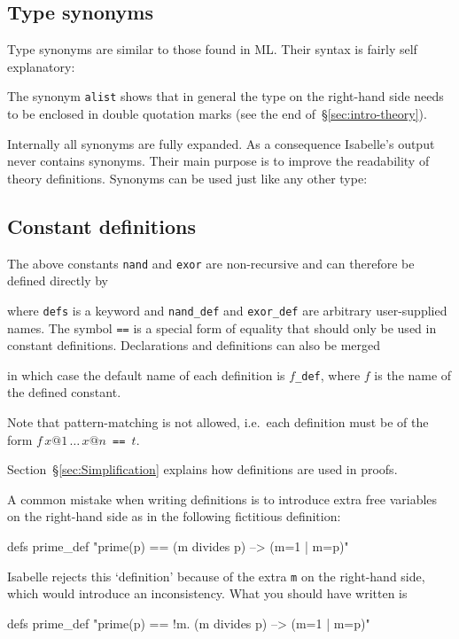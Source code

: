 \subsection{Type synonyms}

Type synonyms are similar to those found in ML. Their syntax is fairly self
explanatory:
\begin{ttbox}
\end{ttbox}
The synonym \texttt{alist} shows that in general the type on the right-hand
side needs to be enclosed in double quotation marks
(see the end of~\S\ref{sec:intro-theory}).

Internally all synonyms are fully expanded.  As a consequence Isabelle's
output never contains synonyms.  Their main purpose is to improve the
readability of theory definitions.  Synonyms can be used just like any other
type:
\begin{ttbox}
\end{ttbox}

\subsection{Constant definitions}
\label{sec:ConstDefinitions}

The above constants \texttt{nand} and \texttt{exor} are non-recursive and can
therefore be defined directly by
\begin{ttbox}
\end{ttbox}
where \texttt{defs} is a keyword and \texttt{nand_def} and \texttt{exor_def}
are arbitrary user-supplied names.
The symbol \texttt{==} is a special form of equality
that should only be used in constant definitions.
Declarations and definitions can also be merged
\begin{ttbox}
\end{ttbox}
in which case the default name of each definition is $f$\texttt{_def}, where
$f$ is the name of the defined constant.

Note that pattern-matching is not allowed, i.e.\ each definition must be of
the form $f\,x@1\,\dots\,x@n$\texttt{~==~}$t$.

Section~\S\ref{sec:Simplification} explains how definitions are used
in proofs.

\begin{warn}
A common mistake when writing definitions is to introduce extra free variables
on the right-hand side as in the following fictitious definition:
\begin{ttbox}
defs  prime_def "prime(p) == (m divides p) --> (m=1 | m=p)"
\end{ttbox}
Isabelle rejects this `definition' because of the extra {\tt m} on the
right-hand side, which would introduce an inconsistency.  What you should have
written is
\begin{ttbox}
defs  prime_def "prime(p) == !m. (m divides p) --> (m=1 | m=p)"
\end{ttbox}
\end{warn}




